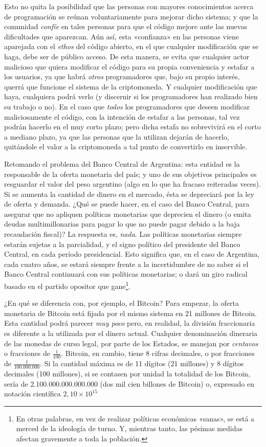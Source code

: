 \documentclass[12pt,a4paper,twoside]{book}
\begin{document}
Esto no quita la posibilidad que las personas con mayores conocimientos acerca de programación se reúnan voluntariamente para mejorar dicho sistema; y que la comunidad \textit{confíe} en tales personas para que el código mejore ante las nuevas dificultades que aparezcan. Aún así, esta «confianza» en las personas viene aparejada con el \textit{ethos} del código abierto, en el que cualquier modificación que se haga, debe ser de público acceso. De esta manera, se evita que cualquier actor malicioso que quiera modificar el código para su propia conveniencia y estafar a los usuarios, ya que habrá \textit{otros} programadores que, bajo su propio interés, querrá que funcione el sistema de la criptomoneda. Y cualquier modificación que haya, cualquiera podrá verlo (y discernir si los programadores han realizado bien su trabajo o no). En el caso que \textit{todos} los programadores que deseen modificar maliciosamente el código, con la intención de estafar a las personas, tal vez podrán hacerlo en el muy corto plazo; pero dicha estafa no sobrevivirá en el corto a mediano plazo, ya que las personas que la utilizan dejarán de hacerlo, quitándole el valor a la criptomoneda a tal punto de convertirlo en inservible.

Retomando el problema del Banco Central de Argentina: esta entidad es la responsable de la oferta monetaria del país; y uno de sus objetivos principales es resguardar el valor del peso argentino (algo en lo que ha fracaso reiteradas veces). Si se aumenta la cantidad de dinero en el mercado, ésta se depreciará por la ley de oferta y demanda. ¿Qué se puede hacer, en el caso del Banco Central, para asegurar que no apliquen políticas monetarias que deprecien el dinero (o emita deudas multimillonarias para pagar lo que no puede pagar debido a la baja recaudación fiscal)? La respuesta es, \textit{nada}. Las políticas monetarias siempre estarán sujetas a la parcialidad, y el  signo político del presidente del Banco Central, en cada período presidencial. Esto significa que, en el caso de Argentina, cada cuatro años, se estará siempre frente a la incertidumbre de no saber si el Banco Central continuará con sus políticas monetarias; o dará un giro radical basado en el partido opositor que gane\footnote{En otras palabras, en vez de realizar políticas económicas «sanas», se está a merced de la ideología de turno. Y, mientras tanto, las pésimas medidas afectan gravemente a toda la población.}.

¿En qué se diferencia con, por ejemplo, el Bitcoin? Para empezar, la oferta monetaria de Bitcoin está fijada por el  mismo sistema en 21 millones de Bitcoin. Esta cantidad podrá parecer \textit{muy poco} pero, en realidad, la división fraccionaria es diferente a la utilizada por el dinero actual. Cualquier denominación dineraria de las monedas de curso legal, por parte de los Estados, se manejan por \textit{centavos} o fracciones de $ \frac{1}{100} $. Bitcoin, en cambio, tiene 8 cifras decimales, o por fracciones de $ \frac{1}{100.000.000} $. Si la cantidad máxima es de 11 dígitos (21 millones) y 8 dígitos decimales (100 millones), si se contasen por unidad la totalidad de los Bitcoin, sería de 2.100.000.000.000.000 (dos mil cien billones de Bitcoin) o, expresado en notación científica $ 2,10 \times 10^{15} $
\end{document}
